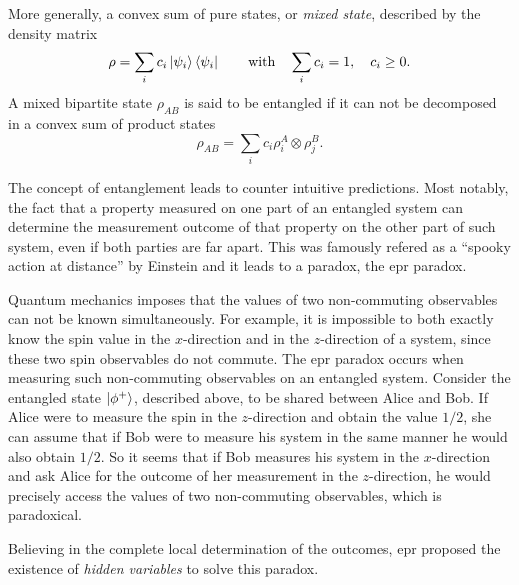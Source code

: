 More generally, a convex sum of pure states, or \textit{mixed state}, described by the density matrix
\begin{equation}
	\rho = \sum_i c_i \ket{\psi_i} \bra{\psi_i} \qquad \text{with} \quad \sum_i c_i = 1,\quad c_i\geq 0.
	\label{eq:mixed_state}
\end{equation}
A mixed bipartite state $\rho_{AB}$ is said to be entangled if it can not be decomposed in a convex sum of product states
\begin{equation}
	\rho_{AB} = \sum_i c_i \rho^A_i \otimes \rho^B_j.
	\label{eq:product_state}
\end{equation}

\medbreak

The concept of entanglement leads to counter intuitive predictions. 
Most notably, the fact that a property measured on one part of an entangled system can determine the measurement outcome of that property on the other part of such system, even if both parties are far apart. 
This was famously refered as a \enquote{spooky action at distance} by Einstein and it leads to a paradox, the \acrshort{epr} paradox.

Quantum mechanics imposes that the values of two non-commuting observables can not be known simultaneously. 
For example, it is impossible to both exactly know the spin value in the $x$-direction and in the $z$-direction of a system, since these two spin observables do not commute.
The \acrshort{epr} paradox occurs when measuring such non-commuting observables on an entangled system.
Consider the entangled state $\ket{\phi^+}$, described above, to be shared between Alice and Bob.
If Alice were to measure the spin in the $z$-direction and obtain the value $1/2$, she can assume that if Bob were to measure his system in the same manner he would also obtain $1/2$. 
So it seems that if Bob measures his system in the $x$-direction and ask Alice for the outcome of her measurement in the $z$-direction, he would precisely access the values of two non-commuting observables, which is paradoxical.

Believing in the complete local determination of the outcomes, \acrlong{epr} proposed the existence of \textit{hidden variables} to solve this paradox. 

